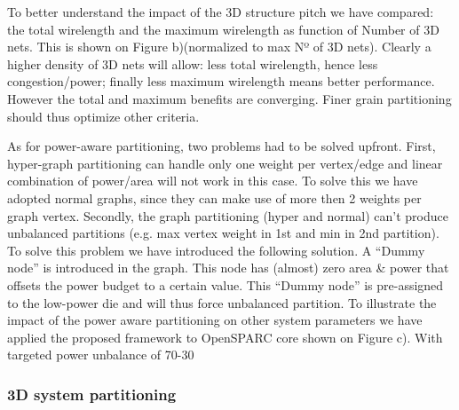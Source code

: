 To better understand the impact of the 3D structure pitch we have compared: the total wirelength and the maximum wirelength as function of Number of 3D nets. This is shown on Figure b)(normalized to max Nº of 3D nets). Clearly a higher density of 3D nets will allow: less total wirelength, hence less congestion/power; finally less maximum wirelength means better performance. However the total and maximum benefits are converging. Finer grain partitioning should thus optimize other criteria.

As for power-aware partitioning, two problems had to be solved upfront. First, hyper-graph partitioning can handle only one weight per vertex/edge and linear combination of power/area will not work in this case. To solve this we have adopted normal graphs, since they can make use of more then 2 weights per graph vertex. Secondly, the graph partitioning (hyper and normal) can’t produce unbalanced partitions (e.g. max vertex weight in 1st and min in 2nd partition). To solve this problem we have introduced the following solution. A “Dummy node” is introduced in the graph. This node has (almost) zero area \& power that offsets the power budget to a certain value. This “Dummy node” is pre-assigned to the low-power die and will thus force unbalanced partition. To illustrate the impact of the power aware partitioning on other system parameters we have applied the proposed framework to OpenSPARC core shown on Figure c). With targeted power unbalance of 70-30%

\subsubsection{3D system partitioning}
